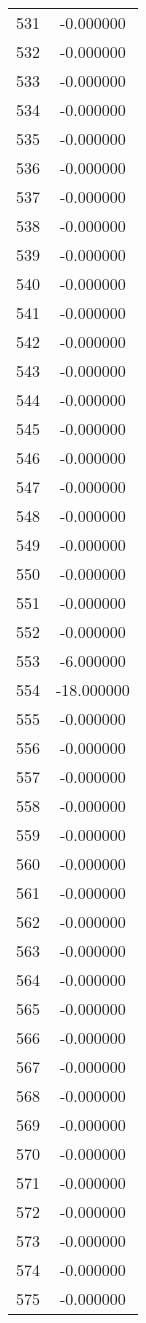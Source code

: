 \documentclass[12pt]{article}
\begin{document}
\begin{longtable}{@{}cc@{}}
531 & -0.000000 \\
532 & -0.000000 \\
533 & -0.000000 \\
534 & -0.000000 \\
535 & -0.000000 \\
536 & -0.000000 \\
537 & -0.000000 \\
538 & -0.000000 \\
539 & -0.000000 \\
540 & -0.000000 \\
541 & -0.000000 \\
542 & -0.000000 \\
543 & -0.000000 \\
544 & -0.000000 \\
545 & -0.000000 \\
546 & -0.000000 \\
547 & -0.000000 \\
548 & -0.000000 \\
549 & -0.000000 \\
550 & -0.000000 \\
551 & -0.000000 \\
552 & -0.000000 \\
553 & -6.000000 \\
554 & -18.000000 \\
555 & -0.000000 \\
556 & -0.000000 \\
557 & -0.000000 \\
558 & -0.000000 \\
559 & -0.000000 \\
560 & -0.000000 \\
561 & -0.000000 \\
562 & -0.000000 \\
563 & -0.000000 \\
564 & -0.000000 \\
565 & -0.000000 \\
566 & -0.000000 \\
567 & -0.000000 \\
568 & -0.000000 \\
569 & -0.000000 \\
570 & -0.000000 \\
571 & -0.000000 \\
572 & -0.000000 \\
573 & -0.000000 \\
574 & -0.000000 \\
575 & -0.000000 \\

\end{longtable}
\end{document}

